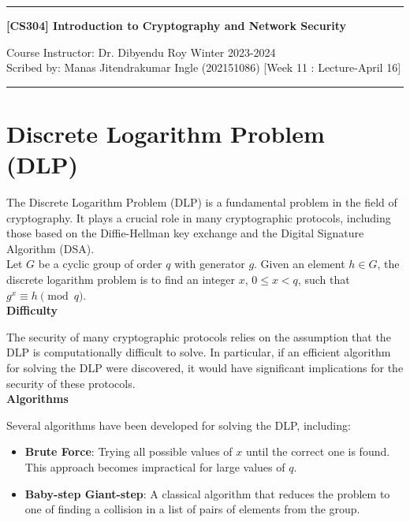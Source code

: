 \documentclass[11pt]{article}
\begin{document}
\setlength{\parindent}{0pt} %
\setlength{\parskip}{10pt}   %
\renewcommand{\baselinestretch}{1.2} %
\noindent
\rule{\textwidth}{2pt}
\begin{center}
{\bf [CS304] Introduction to Cryptography and Network Security}
\end{center}
Course Instructor: Dr. Dibyendu Roy \hfill Winter 2023-2024\\Scribed by: Manas Jitendrakumar Ingle (202151086) \hfill  [Week 11 : Lecture-April 16]
\rule{\textwidth}{2pt}
\section{Discrete Logarithm Problem (DLP)}
The Discrete Logarithm Problem (DLP) is a fundamental problem in the field of cryptography. It plays a crucial role in many cryptographic protocols, including those based on the Diffie-Hellman key exchange and the Digital Signature Algorithm (DSA).
\\

Let $G$ be a cyclic group of order $q$ with generator $g$. Given an element $h \in G$, the discrete logarithm problem is to find an integer $x$, $0 \leq x < q$, such that $g^x \equiv h \pmod{q}$.
\\

\textbf{Difficulty}

The security of many cryptographic protocols relies on the assumption that the DLP is computationally difficult to solve. In particular, if an efficient algorithm for solving the DLP were discovered, it would have significant implications for the security of these protocols.
\\

\textbf{Algorithms}

Several algorithms have been developed for solving the DLP, including:

\begin{itemize}
    \item \textbf{Brute Force}: Trying all possible values of $x$ until the correct one is found. This approach becomes impractical for large values of $q$.
    \item \textbf{Baby-step Giant-step}: A classical algorithm that reduces the problem to one of finding a collision in a list of pairs of elements from the group.
    
\end{itemize}
\end{document}
